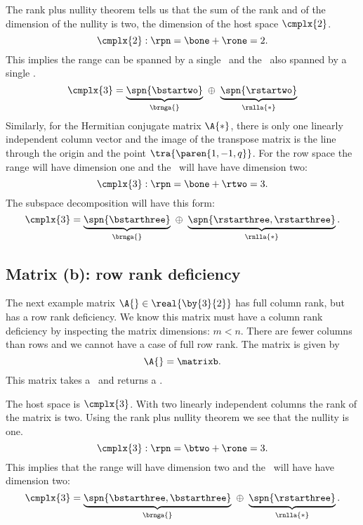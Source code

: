 The rank plus nullity theorem tells us that the sum of the rank and of the dimension of the nullity is two, the dimension of the host space $\cmplx{2}$. 
\begin{equation}
  \cmplx{2}: \rpn = \bone + \rone = 2  .
\end{equation}
This implies the range can be spanned by a single \vv \ and the \ns \ also spanned by a single \vv.
%
\begin{equation}
  \cmplx{3} =  
    \underbrace{\spn{\bstartwo}}_{\brnga{}} \  \oplus \  
    \underbrace{\spn{\rstartwo}}_{\rnlla{*}}
\end{equation}
%
Similarly, for the Hermitian conjugate matrix $\A{*}$, there is only one linearly independent column vector and the image of the transpose matrix is the line through the origin and the point $\tra{\paren{1,-1,q}}$. For the row space the range will have dimension one and the \ns \ will have have dimension two:
\begin{equation}
  \cmplx{3}: \rpn  = \bone + \rtwo = 3  .
\end{equation}
The subspace decomposition will have this form:
\begin{equation}
  \cmplx{3} =  
    \underbrace{\spn{\bstarthree}}_{\brnga{}} \  \oplus \  
    \underbrace{\spn{\rstarthree, \rstarthree}}_{\rnlla{*}} .
\end{equation}

\subsection{Matrix (b): row rank deficiency}
The next example matrix $\A{}\in\real{\by{3}{2}}$ has full column rank, but has a row rank deficiency. We know this matrix must have a column rank deficiency  by inspecting the matrix dimensions: $m < n$. There are fewer columns than rows and we cannot have a case of full row rank. The matrix is given by 
\begin{equation}
  \A{} = \matrixb.
  \label{eq:matrix b}
\end{equation}
This matrix takes a \vv \ and returns a \vvv.

The host space is $\cmplx{3}$. With two linearly independent columns the rank of the matrix is two. Using the rank plus nullity theorem we see that the nullity is one.
\begin{equation}
  \cmplx{3}: \rpn  = \btwo + \rone = 3  .
\end{equation}
This implies that the range will have dimension two and the \ns \ will have have dimension two:
\begin{equation}
  \cmplx{3} =  
    \underbrace{\spn{\bstarthree, \bstarthree}}_{\brnga{}}\  \oplus \ 
    \underbrace{\spn{\rstarthree}}_{\rnlla{*}}   .
\end{equation}

